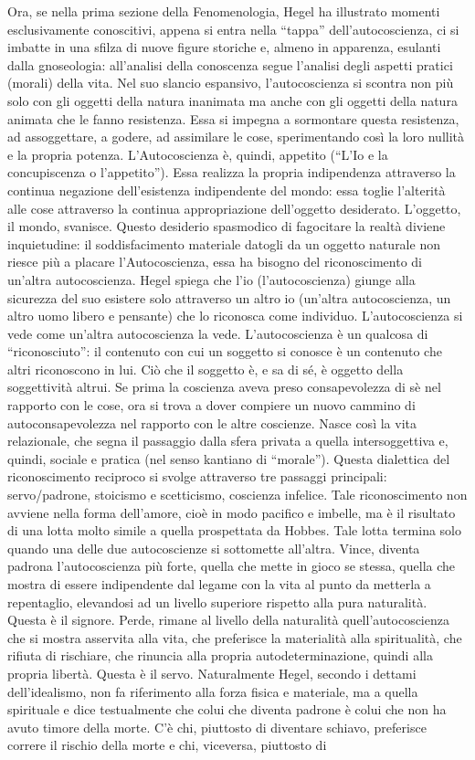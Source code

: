 \documentclass[a4paper,12pt,oneside,openany]{book}%
\begin{document}
Ora, se nella prima sezione della Fenomenologia, Hegel ha illustrato momenti esclusivamente conoscitivi, appena si entra nella “tappa” dell’autocoscienza, ci si imbatte in una sfilza di nuove figure storiche e, almeno in apparenza, esulanti dalla gnoseologia: all’analisi della conoscenza segue l’analisi degli aspetti pratici (morali) della vita. Nel suo slancio espansivo, l’autocoscienza si scontra non più solo con gli oggetti della natura inanimata ma anche con gli oggetti della natura animata che le fanno resistenza. Essa si impegna a sormontare questa resistenza, ad assoggettare, a godere, ad assimilare le cose, sperimentando così la loro nullità e la propria potenza. L’Autocoscienza è, quindi, appetito (“L’Io e la concupiscenza o l’appetito”). Essa realizza la propria indipendenza attraverso la continua negazione dell’esistenza indipendente del mondo: essa toglie l’alterità alle cose attraverso la continua appropriazione dell’oggetto desiderato. L’oggetto, il mondo, svanisce. Questo desiderio spasmodico di fagocitare la realtà diviene inquietudine: il soddisfacimento materiale datogli da un oggetto naturale non riesce più a placare l’Autocoscienza, essa ha bisogno del riconoscimento di un’altra autocoscienza.  Hegel spiega che l’io (l’autocoscienza) giunge alla sicurezza del suo esistere solo attraverso un altro io (un’altra autocoscienza, un altro uomo libero e pensante) che lo riconosca come individuo. L’autocoscienza si vede come un’altra autocoscienza la vede. L’autocoscienza è un qualcosa di “riconosciuto”: il contenuto con cui un soggetto si conosce è un contenuto che altri riconoscono in lui. Ciò che il soggetto è, e sa di sé, è oggetto della soggettività altrui. Se prima la coscienza aveva preso consapevolezza di sè nel rapporto con le cose, ora si trova a dover compiere un nuovo cammino di autoconsapevolezza nel rapporto con le altre coscienze. Nasce così la vita relazionale, che segna il passaggio dalla sfera privata a quella intersoggettiva e, quindi, sociale e pratica (nel senso kantiano di “morale”). Questa dialettica del riconoscimento reciproco si svolge attraverso tre passaggi principali: servo/padrone, stoicismo e scetticismo, coscienza infelice. Tale riconoscimento non avviene nella forma dell’amore, cioè in modo pacifico e imbelle, ma è il risultato di una lotta molto simile a quella prospettata da Hobbes. Tale lotta termina solo quando una delle due autocoscienze si sottomette all’altra. Vince, diventa padrona l’autocoscienza più forte, quella che mette in gioco se stessa, quella che mostra di essere indipendente dal legame con la vita al punto da metterla a repentaglio, elevandosi ad un livello superiore rispetto alla pura naturalità. Questa è il signore. Perde, rimane al livello della naturalità quell’autocoscienza che si mostra asservita alla vita, che preferisce la materialità alla spiritualità, che rifiuta di rischiare, che rinuncia alla propria autodeterminazione, quindi alla propria libertà. Questa è il servo. Naturalmente Hegel, secondo i dettami dell’idealismo, non fa riferimento alla forza fisica e materiale, ma a quella spirituale e dice testualmente che colui che diventa padrone è colui che non ha avuto timore della morte. C’è chi, piuttosto di diventare schiavo, preferisce correre il rischio della morte e chi, viceversa, piuttosto di 
\end{document}
